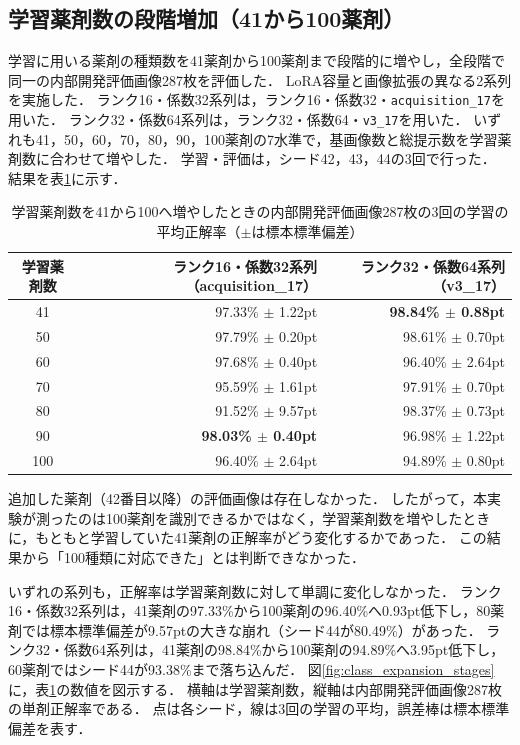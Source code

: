 \documentclass[uplatex,dvipdfmx]{jsarticle}
\begin{document}
\subsection{学習薬剤数の段階増加（41から100薬剤）}\label{sec:class_expansion}

学習に用いる薬剤の種類数を41薬剤から100薬剤まで段階的に増やし，全段階で同一の内部開発評価画像287枚を評価した．
LoRA容量と画像拡張の異なる2系列を実施した．
ランク16・係数32系列は，ランク16・係数32・\texttt{acquisition\_17}を用いた．
ランク32・係数64系列は，ランク32・係数64・\texttt{v3\_17}を用いた．
いずれも41，50，60，70，80，90，100薬剤の7水準で，基画像数と総提示数を学習薬剤数に合わせて増やした．
学習・評価は，シード42，43，44の3回で行った．
結果を表\ref{tab:class_expansion}に示す．

\begin{table}[htbp]
  \centering
  \caption{学習薬剤数を41から100へ増やしたときの内部開発評価画像287枚の3回の学習の平均正解率（$\pm$は標本標準偏差）}
  \label{tab:class_expansion}
  \small
  \begin{tabular}{|c|r|r|}
    \hline
    学習薬剤数 & ランク16・係数32系列（acquisition\_17） & ランク32・係数64系列（v3\_17） \\ \hline
    41 & 97.33\% $\pm$ 1.22pt & \textbf{98.84\% $\pm$ 0.88pt} \\ \hline
    50 & 97.79\% $\pm$ 0.20pt & 98.61\% $\pm$ 0.70pt \\ \hline
    60 & 97.68\% $\pm$ 0.40pt & 96.40\% $\pm$ 2.64pt \\ \hline
    70 & 95.59\% $\pm$ 1.61pt & 97.91\% $\pm$ 0.70pt \\ \hline
    80 & 91.52\% $\pm$ 9.57pt & 98.37\% $\pm$ 0.73pt \\ \hline
    90 & \textbf{98.03\% $\pm$ 0.40pt} & 96.98\% $\pm$ 1.22pt \\ \hline
    100 & 96.40\% $\pm$ 2.64pt & 94.89\% $\pm$ 0.80pt \\ \hline
  \end{tabular}
\end{table}

追加した薬剤（42番目以降）の評価画像は存在しなかった．
したがって，本実験が測ったのは100薬剤を識別できるかではなく，学習薬剤数を増やしたときに，もともと学習していた41薬剤の正解率がどう変化するかであった．
この結果から「100種類に対応できた」とは判断できなかった．

いずれの系列も，正解率は学習薬剤数に対して単調に変化しなかった．
ランク16・係数32系列は，41薬剤の97.33\%から100薬剤の96.40\%へ0.93pt低下し，80薬剤では標本標準偏差が9.57ptの大きな崩れ（シード44が80.49\%）があった．
ランク32・係数64系列は，41薬剤の98.84\%から100薬剤の94.89\%へ3.95pt低下し，60薬剤ではシード44が93.38\%まで落ち込んだ．
図\ref{fig:class_expansion_stages}に，表\ref{tab:class_expansion}の数値を図示する．
横軸は学習薬剤数，縦軸は内部開発評価画像287枚の単剤正解率である．
点は各シード，線は3回の学習の平均，誤差棒は標本標準偏差を表す．
\end{document}
